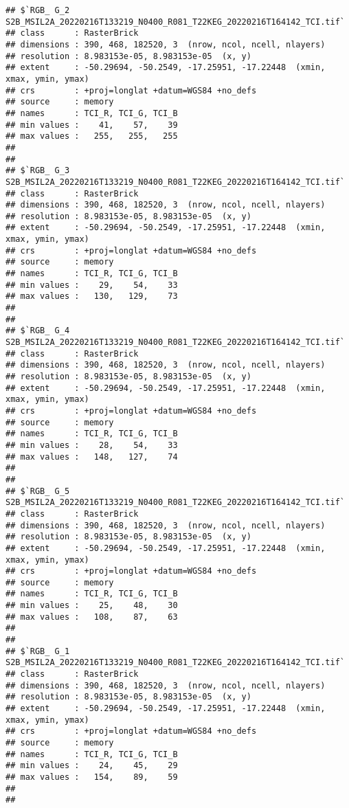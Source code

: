 \documentclass[
]{article}
\begin{document}
\begin{verbatim}
## $`RGB_ G_2 S2B_MSIL2A_20220216T133219_N0400_R081_T22KEG_20220216T164142_TCI.tif`
## class      : RasterBrick 
## dimensions : 390, 468, 182520, 3  (nrow, ncol, ncell, nlayers)
## resolution : 8.983153e-05, 8.983153e-05  (x, y)
## extent     : -50.29694, -50.2549, -17.25951, -17.22448  (xmin, xmax, ymin, ymax)
## crs        : +proj=longlat +datum=WGS84 +no_defs 
## source     : memory
## names      : TCI_R, TCI_G, TCI_B 
## min values :    41,    57,    39 
## max values :   255,   255,   255 
## 
## 
## $`RGB_ G_3 S2B_MSIL2A_20220216T133219_N0400_R081_T22KEG_20220216T164142_TCI.tif`
## class      : RasterBrick 
## dimensions : 390, 468, 182520, 3  (nrow, ncol, ncell, nlayers)
## resolution : 8.983153e-05, 8.983153e-05  (x, y)
## extent     : -50.29694, -50.2549, -17.25951, -17.22448  (xmin, xmax, ymin, ymax)
## crs        : +proj=longlat +datum=WGS84 +no_defs 
## source     : memory
## names      : TCI_R, TCI_G, TCI_B 
## min values :    29,    54,    33 
## max values :   130,   129,    73 
## 
## 
## $`RGB_ G_4 S2B_MSIL2A_20220216T133219_N0400_R081_T22KEG_20220216T164142_TCI.tif`
## class      : RasterBrick 
## dimensions : 390, 468, 182520, 3  (nrow, ncol, ncell, nlayers)
## resolution : 8.983153e-05, 8.983153e-05  (x, y)
## extent     : -50.29694, -50.2549, -17.25951, -17.22448  (xmin, xmax, ymin, ymax)
## crs        : +proj=longlat +datum=WGS84 +no_defs 
## source     : memory
## names      : TCI_R, TCI_G, TCI_B 
## min values :    28,    54,    33 
## max values :   148,   127,    74 
## 
## 
## $`RGB_ G_5 S2B_MSIL2A_20220216T133219_N0400_R081_T22KEG_20220216T164142_TCI.tif`
## class      : RasterBrick 
## dimensions : 390, 468, 182520, 3  (nrow, ncol, ncell, nlayers)
## resolution : 8.983153e-05, 8.983153e-05  (x, y)
## extent     : -50.29694, -50.2549, -17.25951, -17.22448  (xmin, xmax, ymin, ymax)
## crs        : +proj=longlat +datum=WGS84 +no_defs 
## source     : memory
## names      : TCI_R, TCI_G, TCI_B 
## min values :    25,    48,    30 
## max values :   108,    87,    63 
## 
## 
## $`RGB_ G_1 S2B_MSIL2A_20220216T133219_N0400_R081_T22KEG_20220216T164142_TCI.tif`
## class      : RasterBrick 
## dimensions : 390, 468, 182520, 3  (nrow, ncol, ncell, nlayers)
## resolution : 8.983153e-05, 8.983153e-05  (x, y)
## extent     : -50.29694, -50.2549, -17.25951, -17.22448  (xmin, xmax, ymin, ymax)
## crs        : +proj=longlat +datum=WGS84 +no_defs 
## source     : memory
## names      : TCI_R, TCI_G, TCI_B 
## min values :    24,    45,    29 
## max values :   154,    89,    59 
## 
## 

\end{verbatim}
\end{document}
